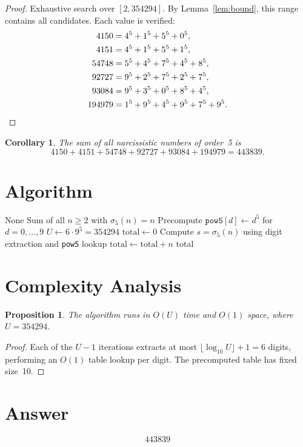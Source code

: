 \documentclass[12pt,a4paper]{article}
\newtheorem{corollary}[theorem]{Corollary}
\newtheorem{proposition}[theorem]{Proposition}
\theoremstyle{definition}
\begin{document}
\begin{proof}
Exhaustive search over $[2, 354294]$. By Lemma~\ref{lem:bound}, this range contains all candidates. Each value is verified:
\begin{align*}
4150 &= 4^5 + 1^5 + 5^5 + 0^5, \\
4151 &= 4^5 + 1^5 + 5^5 + 1^5, \\
54748 &= 5^5 + 4^5 + 7^5 + 4^5 + 8^5, \\
92727 &= 9^5 + 2^5 + 7^5 + 2^5 + 7^5, \\
93084 &= 9^5 + 3^5 + 0^5 + 8^5 + 4^5, \\
194979 &= 1^5 + 9^5 + 4^5 + 9^5 + 7^5 + 9^5. \qedhere
\end{align*}
\end{proof}

\begin{corollary}
The sum of all narcissistic numbers of order~5 is
\[
4150 + 4151 + 54748 + 92727 + 93084 + 194979 = 443839.
\]
\end{corollary}

\section{Algorithm}

\begin{algorithm}[H]
\caption{Sum of Digit Fifth Powers}
\begin{algorithmic}[1]
\REQUIRE None
\ENSURE Sum of all $n \geq 2$ with $\sigma_5(n) = n$
\STATE Precompute $\texttt{pow5}[d] \gets d^5$ for $d = 0, \ldots, 9$
\STATE $U \gets 6 \cdot 9^5 = 354294$
\STATE $\text{total} \gets 0$
    \STATE Compute $s = \sigma_5(n)$ using digit extraction and \texttt{pow5} lookup
        \STATE $\text{total} \gets \text{total} + n$
    \ENDIF
\ENDFOR
\RETURN total
\end{algorithmic}
\end{algorithm}

\section{Complexity Analysis}

\begin{proposition}
The algorithm runs in $O(U)$ time and $O(1)$ space, where $U = 354294$.
\end{proposition}

\begin{proof}
Each of the $U - 1$ iterations extracts at most $\lfloor \log_{10} U \rfloor + 1 = 6$ digits, performing an $O(1)$ table lookup per digit. The precomputed table has fixed size~10.
\end{proof}

\section{Answer}

\[
\boxed{443839}
\]
\end{document}
